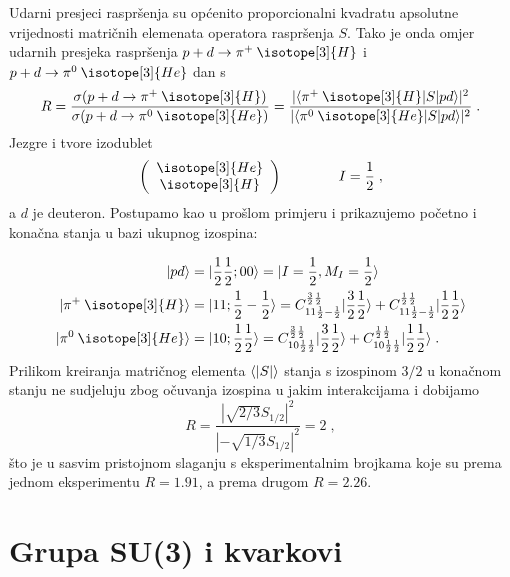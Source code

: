 \begin{primjer} 
Udarni presjeci raspršenja su općenito proporcionalni kvadratu apsolutne
vrijednosti matričnih elemenata operatora raspršenja $S$.
Tako je onda omjer udarnih presjeka raspršenja $p + d \to  \pi^+ \:\isotope[3]{H}$
i $p + d \to  \pi^0 \:\isotope[3]{He}$ dan s
\begin{equation}
 R = \frac{\sigma(p + d \to  \pi^+ \:\isotope[3]{H})}
{\sigma(p + d \to  \pi^0 \:\isotope[3]{He})} = 
\frac{|\bra{\pi^+ \:\isotope[3]{H}}S\ket{p d} |^2}
     {|\bra{\pi^0 \:\isotope[3]{He}}S\ket{p d}|^2} \;.
\end{equation}
Jezgre  i  tvore izodublet
\begin{equation}
   \left(
\begin{array}{c}
\isotope[3]{He} \\ \isotope[3]{H}
\end{array}\right) \qquad \qquad I=\fhalf \;,
\end{equation}
a $d$ je deuteron.
Postupamo kao u prošlom primjeru i prikazujemo početno i konačna
stanja u bazi ukupnog izospina:

\begin{align}
\ket{p d} &= \ket{\fhalf \fhalf ; 0 0} = \ket{I=\fhalf, M_I = \fhalf} \\
\ket{\pi^+ \:\isotope[3]{H}} &= \ket{1 1; \fhalf -\fhalf} = 
  C^{\frac{3}{2} \fhalf}_{1 1 \fhalf -\fhalf} \ket{\frac{3}{2} \fhalf} +
  C^{\frac{1}{2} \fhalf}_{1 1 \fhalf -\fhalf} \ket{\frac{1}{2} \fhalf} \\
\ket{\pi^0 \:\isotope[3]{He}} &= \ket{1 0; \fhalf \fhalf} = 
  C^{\frac{3}{2} \fhalf}_{1 0 \fhalf \fhalf} \ket{\frac{3}{2} \fhalf} +
  C^{\frac{1}{2} \fhalf}_{1 0 \fhalf \fhalf} \ket{\frac{1}{2} \fhalf}  \;.
\end{align}
Prilikom kreiranja matričnog elementa $\langle  |S|  \rangle$ stanja s izospinom
$3/2$ u konačnom stanju ne sudjeluju zbog očuvanja izospina u jakim
interakcijama i dobijamo
\begin{equation}
 R = \frac{|\sqrt{2/3} S_{1/2}|^2}{|-\sqrt{1/3} S_{1/2}|^2} = 2 \;,
\end{equation}
što je u sasvim pristojnom slaganju s eksperimentalnim brojkama
koje su prema jednom eksperimentu $R=1.91$, a prema drugom $R=2.26$.
\end{primjer}

\section{Grupa SU(3) i kvarkovi}


